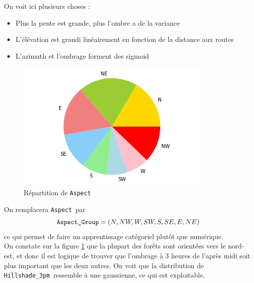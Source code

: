 \documentclass[12pt,a4paper]{article}
\numberwithin{equation}{section}
\newcommand{\aspect}{\texttt{Aspect}}
\newcommand{\hilshadeA}{\texttt{Hillshade\_3pm}}
\begin{document}
	On voit ici plusieurs choses :
	
	\begin{itemize}
		\item Plus la pente est grande, plus l'ombre a de la variance
		\item L'élévation est grandi linéairement en fonction de la distance aux routes
		\item L'azimuth et l'ombrage forment des sigmoid\\
	\end{itemize}

	\begin{figure}
	\centering
	\includegraphics[width=.9\linewidth]{img/aspect}
	\caption{Répartition de \aspect }
	\label{Aspect}
	\end{figure}

	On remplacera \aspect \ par $$\verb!Aspect_Group! = (N,NW,W,SW,S,SE,E,NE)$$ ce qui permet de faire un apprentissage catégoriel plutôt que numérique.\\
	
	On constate sur la figure \ref{Aspect} que la plupart des forêts sont orientées vers le nord-est, et donc il est logique de trouver que l'ombrage à 3 heures de l'après midi soit plus important que les deux autres. On voit que la distribution de \hilshadeA \ ressemble à une gaussienne, ce qui est exploitable. 
	
\end{document}
